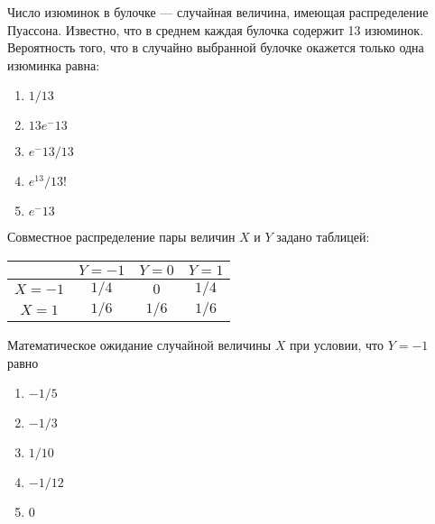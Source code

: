 \documentclass[t]{beamer}
\begin{document}
 \begin{frame} \label{12} 
\begin{block}{12} 

Число изюминок в булочке — случайная величина, имеющая распределение Пуассона. Известно, что в среднем каждая булочка содержит 13 изюминок. Вероятность того, что в случайно выбранной булочке окажется только одна изюминка равна:
 


 \end{block} 
\begin{enumerate} 
\item[] \hyperlink{12-No}{\beamergotobutton{} $1/13$}
\item[] \hyperlink{12-Yes}{\beamergotobutton{} $13e^-13$}
\item[] \hyperlink{12-No}{\beamergotobutton{} $e^-13/13$}
\item[] \hyperlink{12-No}{\beamergotobutton{} $e^13/13!$
}
\item[] \hyperlink{12-No}{\beamergotobutton{} $e^-13$}
\end{enumerate} 
\end{frame} 


 \begin{frame} \label{13} 
\begin{block}{13} 

Совместное распределение пары величин $X$ и $Y$ задано таблицей:
\begin{center}
\begin{tabular}{@{}c|ccc@{}}
\toprule
       & $Y=-1$ & $Y=0$ & $Y=1$ \\ \midrule
$X=-1$ & $1/4$  & $0$   & $1/4$ \\
$X=1$  & $1/6$  & $1/6$ & $1/6$ \\ \bottomrule
\end{tabular}
\end{center}

\vspace{0.5cm} 
 
 
Математическое ожидание случайной величины $X$ при условии, что $Y=-1$ равно
 


 \end{block} 
\begin{enumerate} 
\item[] \hyperlink{13-Yes}{\beamergotobutton{} $-1/5$}
\item[] \hyperlink{13-No}{\beamergotobutton{} $-1/3$}
\item[] \hyperlink{13-No}{\beamergotobutton{} $1/10$
}
\item[] \hyperlink{13-No}{\beamergotobutton{} $-1/12$}
\item[] \hyperlink{13-No}{\beamergotobutton{} $0$}
\end{enumerate} 
\end{frame} 
\end{document}

